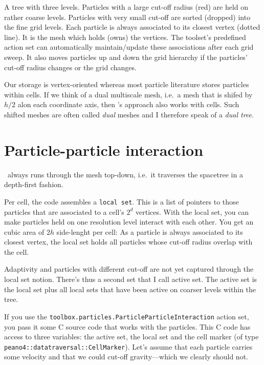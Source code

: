 \noindent
A tree with three levels.
Particles with a large cut-off radius (red) are held on rather coarse levels.
Particles with very small cut-off are sorted (dropped) into the fine grid
levels.
Each particle is always associated to its closest vertex (dotted line).
It is the mesh which holds (owns) the vertices.
The toolset's predefined action set can automatically maintain/update these
associations after each grid sweep.
It also moves particles up and down the grid hierarchy if the particles' cut-off
radius changes or the grid changes.



\begin{definition}
  Our storage is vertex-oriented whereas most particle literature stores
  particles within cells.
  If we think of a dual multiscale mesh, i.e.~a mesh that is shifed by $h/2$
  alon each coordinate axis, then \Peano's approach also works with cells.
  Such shifted meshes are often called \emph{dual} meshes and I therefore speak
  of a \emph{dual tree}.
\end{definition}



\section{Particle-particle interaction}


\Peano\ always runs through the mesh top-down, i.e.~it traverses the spacetree
in a depth-first fashion.


Per cell, the code assembles a \texttt{local set}. 
This is a list of pointers to those particles that are associated to a cell's
$2^d$ vertices.
With the local set, you can make particles held on one resolution level
interact with each other.
You get an cubic area of $2h$ side-lenght per cell:
As a particle is always associated to its closest vertex, the local set holds all particles whose cut-off radius overlap with the cell. 


Adaptivity and particles with different cut-off are not yet captured through the
local set notion.
There's thus a second set that I call active set. 
The active set is the local set plus all local sets that have been active on
coarser levels within the tree.


If you use the \texttt{toolbox.particles.ParticleParticleInteraction} action
set, you pass it some C source code that works with the particles.
This C code has access to three variables: the active set, the local set and the
cell marker (of type \linebreak \texttt{peano4::datatraversal::CellMarker}).
Let's assume that each particle carries some velocity and that we could cut-off
gravity---which we clearly should not.


